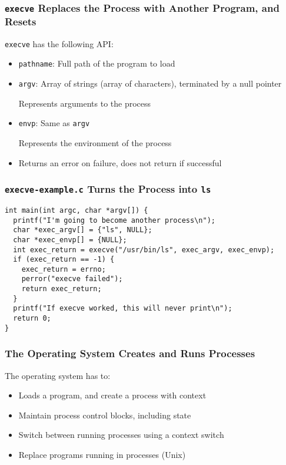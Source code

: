   \begin{frame}
    \frametitle{\texttt{execve} Replaces the Process with Another Program, and Resets}

    \texttt{execve} has the following API:
    \begin{itemize}
      \item \texttt{pathname}: Full path of the program to load
      \item \texttt{argv}: Array of strings (array of characters), terminated by a null pointer

            \hspace{2em} Represents arguments to the process
      \item \texttt{envp}: Same as \texttt{argv}

            \hspace{2em} Represents the environment of the process
      \item Returns an error on failure, does not return if successful
    \end{itemize}
  \end{frame}

  \begin{frame}[fragile]
    \frametitle{\texttt{execve-example.c} Turns the Process into \texttt{ls}}

    \begin{lstlisting}
int main(int argc, char *argv[]) {
  printf("I'm going to become another process\n");
  char *exec_argv[] = {"ls", NULL};
  char *exec_envp[] = {NULL};
  int exec_return = execve("/usr/bin/ls", exec_argv, exec_envp);
  if (exec_return == -1) {
    exec_return = errno;
    perror("execve failed");
    return exec_return;
  }
  printf("If execve worked, this will never print\n");
  return 0;
}
    \end{lstlisting}
  \end{frame}

  \begin{frame}
    \frametitle{The Operating System Creates and Runs Processes}

    The operating system has to:
    \begin{itemize}
      \item Loads a program, and create a process with context
      \item Maintain process control blocks, including state
      \item Switch between running processes using a context switch
      \item Replace programs running in processes (Unix)
    \end{itemize}
  \end{frame}




